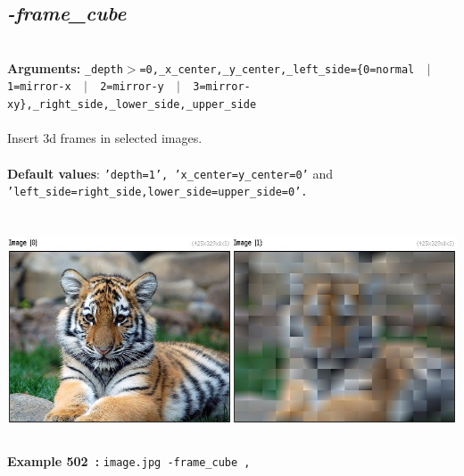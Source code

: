 \documentclass[a4paper,11pt,twoside]{book}
\begin{document}
\subsection{\emph{-frame\_cube} }\vspace*{-0.5em}
~\\\textbf{Arguments: } 
{\small \texttt{\_depth$>$=0,\_x\_center,\_y\_center,\_left\_side=\{0=normal ~$|$~ 1=mirror-x ~$|$~ 2=mirror-y ~$|$~ 3=mirror-xy\},\_right\_side,\_lower\_side,\_upper\_side}}\\~\\
Insert 3d frames in selected images.
~\\~\\\textbf{Default values}: {\small \texttt{'depth=1', 'x\_center=y\_center=0'} and \texttt{'left\_side=right\_side,lower\_side=upper\_side=0'.}}
\begin{center}\includegraphics[keepaspectratio=true,height=7cm,width=\textwidth]{img/gmic_def502.jpg}\\
{\footnotesize \textbf{Example 502~:} \texttt{image.jpg -frame\_cube ,}}
\end{center}
\end{document}
